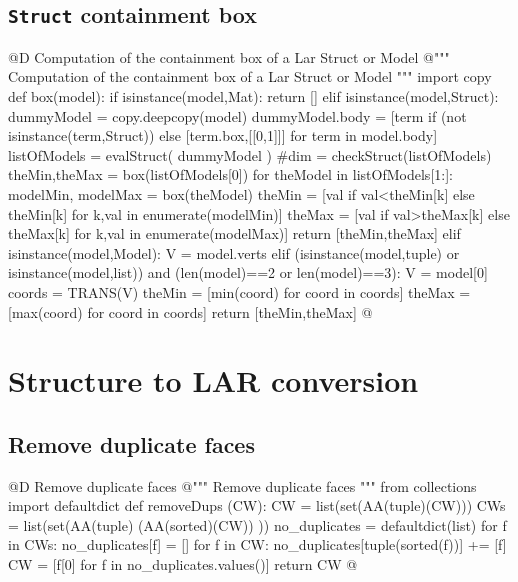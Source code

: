 \documentclass[11pt,oneside]{article}    %
\begin{document}
\subsection{\texttt{Struct} containment box}

@D Computation of the containment box of a Lar Struct or Model
@{""" Computation of the containment box of a Lar Struct or Model """
import copy
def box(model):
    if isinstance(model,Mat): return []
    elif isinstance(model,Struct):
        dummyModel = copy.deepcopy(model)
        dummyModel.body = [term if (not isinstance(term,Struct)) else [term.box,[[0,1]]]  for term in model.body]
        listOfModels = evalStruct( dummyModel )
        #dim = checkStruct(listOfModels)
        theMin,theMax = box(listOfModels[0]) 
        for theModel in listOfModels[1:]:
            modelMin, modelMax = box(theModel)
            theMin = [val if val<theMin[k] else theMin[k] for k,val in enumerate(modelMin)]
            theMax = [val if val>theMax[k] else theMax[k] for k,val in enumerate(modelMax)]
        return [theMin,theMax]
    elif isinstance(model,Model):
        V = model.verts
    elif (isinstance(model,tuple) or isinstance(model,list)) and (len(model)==2 or len(model)==3):
        V = model[0]
    coords = TRANS(V)
    theMin = [min(coord) for coord in coords]
    theMax = [max(coord) for coord in coords]
    return [theMin,theMax]
@}


\section{Structure to LAR conversion}

\subsection{Remove duplicate faces}
@D Remove duplicate faces
@{""" Remove duplicate faces  """
from collections import defaultdict
def removeDups (CW):
    CW = list(set(AA(tuple)(CW)))
    CWs = list(set(AA(tuple)  (AA(sorted)(CW))  ))
    no_duplicates = defaultdict(list)
    for f in CWs: no_duplicates[f] = []
    for f in CW:
        no_duplicates[tuple(sorted(f))] += [f]
    CW = [f[0] for f in no_duplicates.values()]
    return CW
@}
\end{document}
